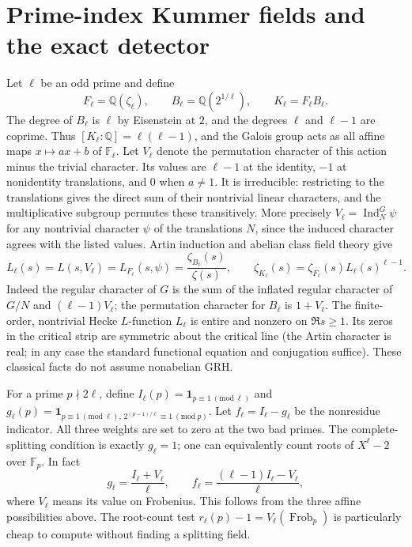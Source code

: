 \documentclass[11pt,letterpaper]{article}
\theoremstyle{definition}\newtheorem{definition}[theorem]{Definition}
\theoremstyle{remark}\newtheorem{remark}[theorem]{Remark}
\newcommand{\Q}{\mathbb Q}\newcommand{\C}{\mathbb C}\newcommand{\R}{\mathbb R}\newcommand{\F}{\mathbb F}\newcommand{\ord}{\operatorname{ord}}\newcommand{\Li}{\operatorname{Li}}\newcommand{\Gal}{\operatorname{Gal}}\newcommand{\Res}{\operatorname{Res}}\newcommand{\ind}{\operatorname{Ind}}\newcommand{\one}{\mathbf 1}
\begin{document}
\section{Prime-index Kummer fields and the exact detector}\label{sec:kummer}
Let $\ell$ be an odd prime and define
\[
F_\ell=\Q(\zeta_\ell),\qquad B_\ell=\Q(2^{1/\ell}),\qquad K_\ell=F_\ell B_\ell.
\]
The degree of $B_\ell$ is $\ell$ by Eisenstein at $2$, and the degrees $\ell$ and $\ell-1$ are coprime. Thus $[K_\ell:\Q]=\ell(\ell-1)$, and the Galois group acts as all affine maps $x\mapsto ax+b$ of $\F_\ell$. Let $V_\ell$ denote the permutation character of this action minus the trivial character. Its values are $\ell-1$ at the identity, $-1$ at nonidentity translations, and $0$ when $a\ne1$. It is irreducible: restricting to the translations gives the direct sum of their nontrivial linear characters, and the multiplicative subgroup permutes these transitively. More precisely $V_\ell=\ind_N^G\psi$ for any nontrivial character $\psi$ of the translations $N$, since the induced character agrees with the listed values. Artin induction and abelian class field theory give
\begin{equation}\label{eq:fact}L_\ell(s)=L(s,V_\ell)=L_{F_\ell}(s,\psi)=\frac{\zeta_{B_\ell}(s)}{\zeta(s)},\qquad \zeta_{K_\ell}(s)=\zeta_{F_\ell}(s)L_\ell(s)^{\ell-1}.
\end{equation}
Indeed the regular character of $G$ is the sum of the inflated regular character of $G/N$ and $(\ell-1)V_\ell$; the permutation character for $B_\ell$ is $1+V_\ell$. The finite-order, nontrivial Hecke $L$-function $L_\ell$ is entire and nonzero on $\Re s\ge1$. Its zeros in the critical strip are symmetric about the critical line (the Artin character is real; in any case the standard functional equation and conjugation suffice). These classical facts do not assume nonabelian GRH.

For a prime $p\nmid 2\ell$, define $I_\ell(p)=\one_{p\equiv1\ (\mathrm{mod}\ \ell)}$ and $g_\ell(p)=\one_{p\equiv1\ (\mathrm{mod}\ \ell),\,2^{(p-1)/\ell}\equiv1\ (\mathrm{mod}\ p)}$. Let $f_\ell=I_\ell-g_\ell$ be the nonresidue indicator. All three weights are set to zero at the two bad primes. The complete-splitting condition is exactly $g_\ell=1$; one can equivalently count roots of $X^\ell-2$ over $\F_p$. In fact
\begin{equation}\label{eq:indicator}g_\ell=\frac{I_\ell+V_\ell}{\ell},\qquad f_\ell=\frac{(\ell-1)I_\ell-V_\ell}{\ell},\end{equation}
where $V_\ell$ means its value on Frobenius. This follows from the three affine possibilities above. The root-count test $r_\ell(p)-1=V_\ell(\operatorname{Frob}_p)$ is particularly cheap to compute without finding a splitting field.
\end{document}
